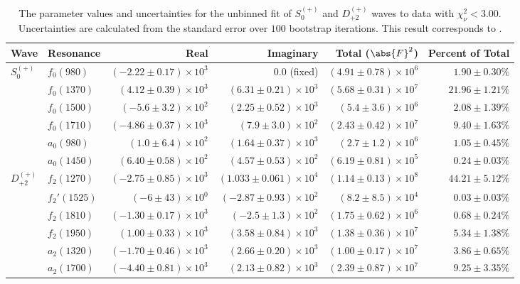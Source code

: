 \begin{table}[ht]
    \begin{center}
        \begin{tabular}{llrrrr}\toprule
        Wave & Resonance & Real & Imaginary & Total ($\abs{F}^2$) & Percent of Total \\\midrule
$S_{0}^{(+)}$ & $f_{0}(980)$ & $(-2.22 \pm 0.17) \times 10^{3}$ & $0.0$ (fixed) & $(4.91 \pm 0.78) \times 10^{6}$ & $1.90 \pm 0.30 \%$ \\
 & $f_{0}(1370)$ & $(4.12 \pm 0.39) \times 10^{3}$ & $(6.31 \pm 0.21) \times 10^{3}$ & $(5.68 \pm 0.31) \times 10^{7}$ & $21.96 \pm 1.21 \%$ \\
 & $f_{0}(1500)$ & $(-5.6 \pm 3.2) \times 10^{2}$ & $(2.25 \pm 0.52) \times 10^{3}$ & $(5.4 \pm 3.6) \times 10^{6}$ & $2.08 \pm 1.39 \%$ \\
 & $f_{0}(1710)$ & $(-4.86 \pm 0.37) \times 10^{3}$ & $(7.9 \pm 3.0) \times 10^{2}$ & $(2.43 \pm 0.42) \times 10^{7}$ & $9.40 \pm 1.63 \%$ \\
 & $a_{0}(980)$ & $(1.0 \pm 6.4) \times 10^{2}$ & $(1.64 \pm 0.37) \times 10^{3}$ & $(2.7 \pm 1.2) \times 10^{6}$ & $1.05 \pm 0.45 \%$ \\
 & $a_{0}(1450)$ & $(6.40 \pm 0.58) \times 10^{2}$ & $(4.57 \pm 0.53) \times 10^{2}$ & $(6.19 \pm 0.81) \times 10^{5}$ & $0.24 \pm 0.03 \%$ \\
$D_{+2}^{(+)}$ & $f_{2}(1270)$ & $(-2.75 \pm 0.85) \times 10^{3}$ & $(1.033 \pm 0.061) \times 10^{4}$ & $(1.14 \pm 0.13) \times 10^{8}$ & $44.21 \pm 5.12 \%$ \\
 & $f_{2}'(1525)$ & $(-6 \pm 43) \times 10^{0}$ & $(-2.87 \pm 0.93) \times 10^{2}$ & $(8.2 \pm 8.5) \times 10^{4}$ & $0.03 \pm 0.03 \%$ \\
 & $f_{2}(1810)$ & $(-1.30 \pm 0.17) \times 10^{3}$ & $(-2.5 \pm 1.3) \times 10^{2}$ & $(1.75 \pm 0.62) \times 10^{6}$ & $0.68 \pm 0.24 \%$ \\
 & $f_{2}(1950)$ & $(1.00 \pm 0.33) \times 10^{3}$ & $(3.58 \pm 0.84) \times 10^{3}$ & $(1.38 \pm 0.36) \times 10^{7}$ & $5.34 \pm 1.38 \%$ \\
 & $a_{2}(1320)$ & $(-1.70 \pm 0.46) \times 10^{3}$ & $(2.66 \pm 0.20) \times 10^{3}$ & $(1.00 \pm 0.17) \times 10^{7}$ & $3.86 \pm 0.65 \%$ \\
 & $a_{2}(1700)$ & $(-4.40 \pm 0.81) \times 10^{3}$ & $(2.13 \pm 0.82) \times 10^{3}$ & $(2.39 \pm 0.87) \times 10^{7}$ & $9.25 \pm 3.35 \%$ \\\bottomrule
        \end{tabular}
    \caption{The parameter values and uncertainties for the unbinned fit of $S_{0}^{(+)}$ and $D_{+2}^{(+)}$ waves to data with $\chi^2_\nu < 3.00$. Uncertainties are calculated from the standard error over $100$ bootstrap iterations. This result corresponds to .}\label{tab:unbinned-fit-chisqdof-3.0-Sp0p-Dp2p}
    \end{center}
\end{table}
